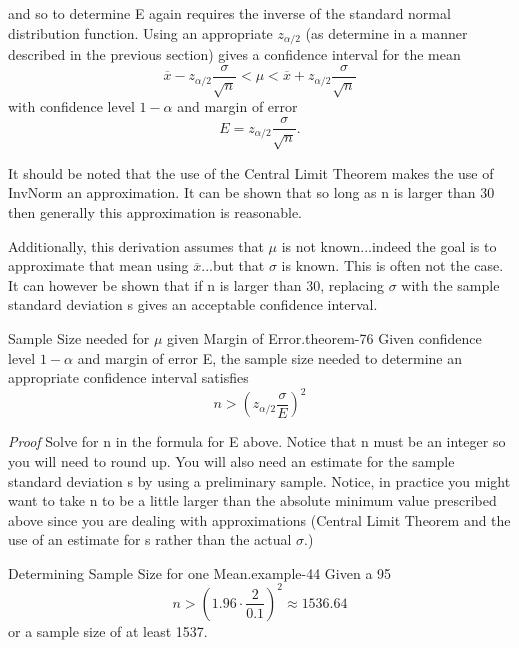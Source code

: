 \documentclass[10pt,]{book}
\makeatletter
\renewcommand*{\proofname}{Proof}
\renewenvironment{proof}[1][\proofname]{\par
  \pushQED{\qed}%
  \normalfont \topsep6\p@\@plus6\p@\relax
  \trivlist
  \item\relax
    {\itshape
    #1\@addpunct{.}}\hspace\labelsep\ignorespaces
}{%
  \popQED\endtrivlist\@endpefalse
}
\numberwithin{equation}{section}
\newcommand{\lt}{<}
\newcommand{\gt}{>}
\makeatother
\begin{document}
and so to determine E again requires the inverse of the standard normal distribution function.  Using an appropriate \(z_{\alpha /2}\) (as determine in a manner described in the previous section) gives a confidence interval for the mean%
\begin{equation*}
\overline{x} - z_{\alpha / 2} \frac{\sigma}{\sqrt{n}} \lt \mu \lt \overline{x} + z_{\alpha / 2} \frac{\sigma}{\sqrt{n}}
\end{equation*}
with confidence level \(1-\alpha\) and margin of error%
\begin{equation*}
E = z_{\alpha /2} \frac{\sigma}{\sqrt{n}}.
\end{equation*}
%
\par
\hypertarget{p-1131}{}%
It should be noted that the use of the Central Limit Theorem makes the use of  InvNorm an approximation. It can be shown that so long as n is larger than 30 then generally this approximation is reasonable.%
\par
\hypertarget{p-1132}{}%
Additionally, this derivation assumes that \(\mu\) is not known...indeed the goal is to approximate that mean using \(\overline{x}\)...but that \(\sigma\) is known. This is often not the case. It can however be shown that if n is larger than 30, replacing \(\sigma\) with the sample standard deviation s gives an acceptable confidence interval.%
\begin{theorem}{Sample Size needed for \(\mu\) given Margin of Error.}{}{theorem-76}%
\hypertarget{p-1133}{}%
Given confidence level \(1-\alpha\) and margin of error E, the sample size needed to determine an appropriate confidence interval satisfies%
\begin{equation*}
n \gt \left ( z_{\alpha /2} \frac{\sigma}{E} \right )^2
\end{equation*}
%
\end{theorem}
\begin{proof}\hypertarget{proof-74}{}
\hypertarget{p-1134}{}%
Solve for n in the formula for E above. Notice that n must be an integer so you will need to round up. You will also need an estimate for the sample standard deviation s by using a preliminary sample.%
\end{proof}
\hypertarget{p-1135}{}%
Notice, in practice you might want to take n to be a little larger than the absolute minimum value prescribed above since you are dealing with approximations (Central Limit Theorem and the use of an estimate for s rather than the actual \(\sigma\).)%
\begin{example}{Determining Sample Size for one Mean.}{example-44}%
\hypertarget{p-1136}{}%
Given a 95%
\begin{equation*}
n \gt \left ( 1.96 \cdot \frac{2}{0.1} \right )^2 \approx 1536.64
\end{equation*}
or a sample size of at least 1537.%
\end{example}
%
%
\typeout{************************************************}
\typeout{************************************************}
%
\end{document}
